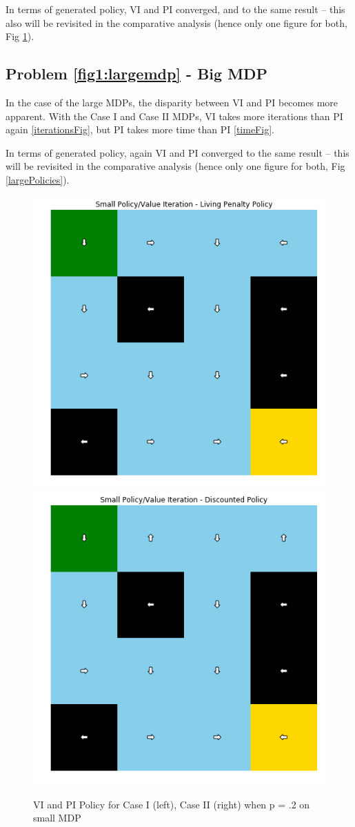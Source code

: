 \documentclass[letter]{article}
\begin{document}
In terms of generated policy, VI and PI converged, and to the same result -- this also will be revisited in the comparative analysis (hence only one figure for both, Fig \ref{smallPolicies}).

\subsection{Problem \ref{fig1:largemdp} - Big MDP}

In the case of the large MDPs, the disparity between VI and PI becomes more apparent. With the Case I and Case II MDPs, VI takes more iterations than PI again \ref{iterationsFig}, but PI takes more time than PI \ref{timeFig}.

In terms of generated policy, again VI and PI converged to the same result -- this will be revisited in the comparative analysis (hence only one figure for both, Fig \ref{largePolicies}).


\begin{figure}[]
    \centering
    \includegraphics[width=.4\linewidth]{smallLivingPenaltyPolicy.png}
    \includegraphics[width=.4\linewidth]{smallDiscountedPolicy.png}
    \caption{VI and PI Policy for Case I (left), Case II (right) when p = .2 on small MDP}
    \label{smallPolicies}
\end{figure}
\end{document}
